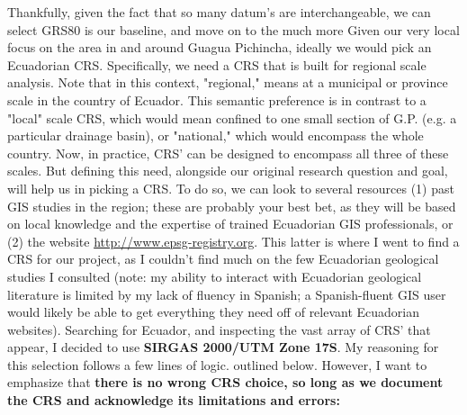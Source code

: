 \documentclass{article}
\begin{document}
Thankfully, given the fact that so many datum's are interchangeable, we can select GRS80 is our baseline, and move on to the much more Given our very local focus on the area in and around Guagua Pichincha, ideally we would pick an Ecuadorian CRS. Specifically, we need a CRS that is built for regional scale analysis. Note that in this context, "regional," means at a municipal or province scale in the country of Ecuador. This semantic preference is in contrast to a "local" scale CRS, which would mean confined to one small section of G.P. (e.g. a particular drainage basin), or "national," which would encompass the whole country. Now, in practice, CRS' can be designed to encompass all three of these scales.  But defining this need, alongside our original research question and goal, will help us in picking a CRS. To do so, we can look to several resources (1) past GIS studies in the region; these are probably your best bet, as they will be based on local knowledge and the expertise of trained Ecuadorian GIS professionals, or (2) the website \url{http://www.epsg-registry.org}. This latter is where I went to find a CRS for our project, as I couldn't find much on the few Ecuadorian geological studies I consulted (note: my ability to interact with Ecuadorian geological literature is limited by my lack of fluency in Spanish; a Spanish-fluent GIS user would likely be able to get everything they need off of relevant Ecuadorian websites). Searching for Ecuador, and inspecting the vast array of CRS' that appear, I decided to use \textbf{SIRGAS 2000/UTM Zone 17S}. My reasoning for this selection follows a few lines of logic. outlined below. However, I want to emphasize that \textbf{there is no wrong CRS choice, so long as we document the CRS and acknowledge its limitations and errors:}
\end{document}
